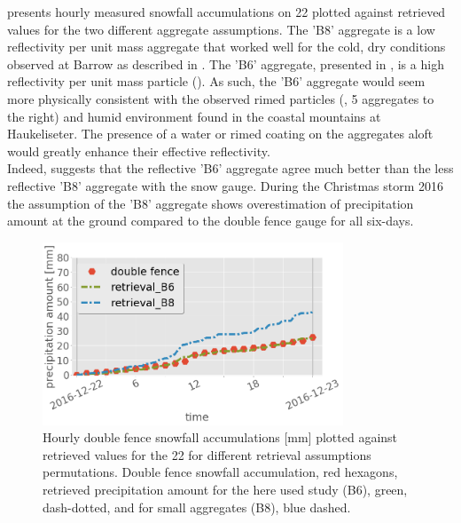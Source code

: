  presents hourly measured snowfall accumulations on \SI{22}{\dec} plotted against retrieved values for the two different aggregate assumptions. The 'B8' aggregate is a low reflectivity per unit mass aggregate that worked well for the cold, dry conditions observed at Barrow as described in \citet{cooper_variational_2017}. The 'B6' aggregate, presented in , is a high reflectivity per unit mass particle ().  As such, the 'B6' aggregate would seem more physically consistent with the observed rimed particles (, 5 aggregates to the right) and humid environment found in the coastal mountains at Haukeliseter.  The presence of a water or rimed coating on the aggregates aloft would greatly enhance their effective reflectivity. 
\\
Indeed,  suggests that the reflective 'B6' aggregate agree much better than the less reflective 'B8' aggregate with the snow gauge. During the Christmas storm 2016 the assumption of the 'B8' aggregate shows overestimation of precipitation amount at the ground compared to the double fence gauge for all six-days.
%
\\
\begin{figure}[t]
	\centering
	\includegraphics[width=0.8\textwidth]{./fig_obs_ret/20161222_2}
	\caption{Hourly double fence snowfall accumulations [mm] plotted against retrieved values for the \SI{22}{\dec} for different retrieval assumptions permutations. Double fence snowfall accumulation, red hexagons, retrieved precipitation amount for the here used study (B6), green, dash-dotted, and for small aggregates (B8), blue dashed.}\label{fig:ret_sensitivity}
\end{figure}
